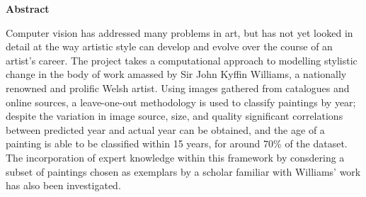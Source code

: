 \thispagestyle{empty}

\begin{center}
    {\LARGE\bf Abstract}
\end{center}

Computer vision has addressed many problems in art, but has not yet looked in detail at the way 
artistic style can develop and evolve over the course of an artist’s career. The project takes 
a computational approach to modelling stylistic change in the body of work amassed by Sir John 
Kyffin Williams, a nationally renowned and prolific Welsh artist. Using images gathered 
from catalogues and online sources, a leave-one-out methodology is used to classify paintings by 
year; despite the variation in image source, size, and quality significant correlations between 
predicted year and actual year can be obtained, and the age of a painting is able to be 
classified within 15 years, for around 70\% of the dataset. The incorporation of expert knowledge 
within this framework by consdering a subset of paintings chosen as exemplars by a scholar 
familiar with Williams' work has also been investigated.
